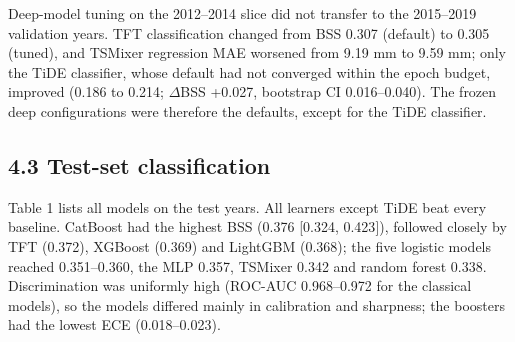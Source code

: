 \documentclass[
]{article}
\begin{document}
Deep-model tuning on the 2012--2014 slice did not transfer to the 2015--2019 validation years. TFT classification changed from BSS 0.307 (default) to 0.305 (tuned), and TSMixer regression MAE worsened from 9.19 mm to 9.59 mm; only the TiDE classifier, whose default had not converged within the epoch budget, improved (0.186 to 0.214; $\Delta$BSS +0.027, bootstrap CI 0.016--0.040).  %
The frozen deep configurations were therefore the defaults, except for the TiDE classifier.

\hypertarget{test-set-classification}{%
\subsection{4.3 Test-set classification}\label{test-set-classification}}

Table 1 lists all models on the test years. All learners except TiDE beat every baseline. CatBoost had the highest BSS (0.376 {[}0.324, 0.423{]}), followed closely by TFT (0.372), XGBoost (0.369) and LightGBM (0.368); the five logistic models reached 0.351--0.360, the MLP 0.357, TSMixer 0.342 and random forest 0.338.  %
Discrimination was uniformly high (ROC-AUC 0.968--0.972 for the classical models), so the models differed mainly in calibration and sharpness; the boosters had the lowest ECE (0.018--0.023).  %
\end{document}
